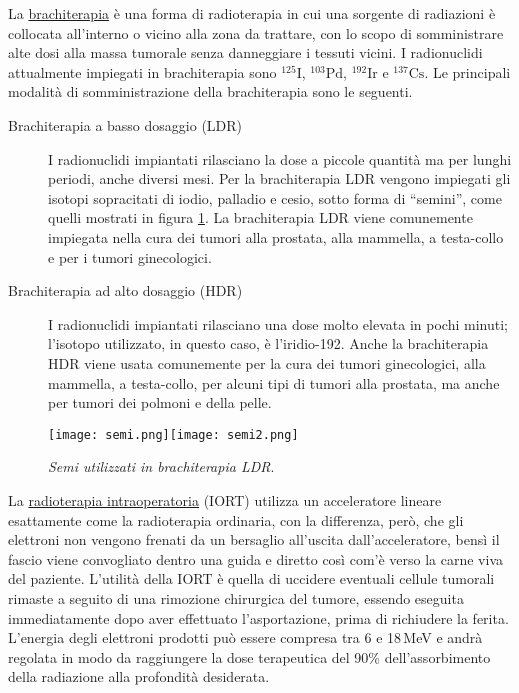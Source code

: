 \documentclass{report}
\newcommand{\virgolette}[1]{``#1''}
\newcommand{\figref}[1]{figura \ref{#1}}
\numberwithin{equation}{section}
\numberwithin{figure}{section}
\begin{document}
La \underline{brachiterapia} è una forma di radioterapia in cui una sorgente di radiazioni è collocata all'interno o vicino alla zona da trattare, con lo scopo di somministrare alte dosi alla massa tumorale senza danneggiare i tessuti vicini. I radionuclidi attualmente impiegati in brachiterapia sono $\mathrm{^{125}I}$, $\mathrm{^{103}Pd}$, $\mathrm{^{192}Ir}$ e $\mathrm{^{137}Cs}$. Le principali modalità di somministrazione della brachiterapia sono le seguenti.
\begin{description}
    \item[Brachiterapia a basso dosaggio (LDR)] I radionuclidi impiantati rilasciano la dose a piccole quantità ma per lunghi periodi, anche diversi mesi. Per la brachiterapia LDR vengono impiegati gli isotopi sopracitati di iodio, palladio e cesio, sotto forma di \virgolette{semini}, come quelli mostrati in \figref{fig:semi}. La brachiterapia LDR viene comunemente impiegata nella cura dei tumori alla prostata, alla mammella, a testa-collo e per i tumori ginecologici.
    \item[Brachiterapia ad alto dosaggio (HDR)] I radionuclidi impiantati rilasciano una dose molto elevata in pochi minuti; l'isotopo utilizzato, in questo caso, è l'iridio-192. Anche la brachiterapia HDR viene usata comunemente per la cura dei tumori ginecologici, alla mammella, a testa-collo, per alcuni tipi di tumori alla prostata, ma anche per tumori dei polmoni e della pelle.
\end{description}

\begin{figure}[htp]
\centering
\texttt{[image: semi.png]}\quad\texttt{[image: semi2.png]}
\caption{\label{fig:semi} \textit{Semi utilizzati in brachiterapia LDR}.}
\end{figure}

La \underline{radioterapia intraoperatoria} (IORT) utilizza un acceleratore lineare esattamente come la radioterapia ordinaria, con la differenza, però, che gli elettroni non vengono frenati da un bersaglio all'uscita dall'acceleratore, bensì il fascio viene convogliato dentro una guida e diretto così com'è verso la carne viva del paziente. L'utilità della IORT è quella di uccidere eventuali cellule tumorali rimaste a seguito di una rimozione chirurgica del tumore, essendo eseguita immediatamente dopo aver effettuato l'asportazione, prima di richiudere la ferita. L'energia degli elettroni prodotti può essere compresa tra 6 e 18\,MeV e andrà regolata in modo da raggiungere la dose terapeutica del 90\% dell'assorbimento della radiazione alla profondità desiderata.
\end{document}
